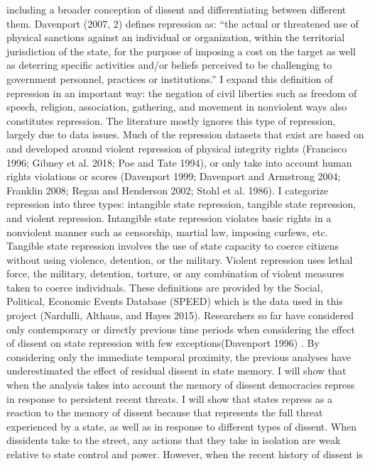 \documentclass[ignorenonframetext,]{beamer}
\begin{document}
\begin{frame}[fragile]
including a broader conception of dissent and differentiating between
different them. Davenport (2007, 2) defines repression as: ``the actual
or threatened use of physical sanctions against an individual or
organization, within the territorial jurisdiction of the state, for the
purpose of imposing a cost on the target as well as deterring specific
activities and/or beliefs perceived to be challenging to government
personnel, practices or institutions.'' I expand this definition of
repression in an important way: the negation of civil liberties such as
freedom of speech, religion, association, gathering, and movement in
nonviolent ways also constitutes repression. The literature mostly
ignores this type of repression, largely due to data issues. Much of the
repression datasets that exist are based on and developed around violent
repression of physical integrity rights (Francisco 1996; Gibney et al.
2018; Poe and Tate 1994), or only take into account human rights
violations or scores (Davenport 1999; Davenport and Armstrong 2004;
Franklin 2008; Regan and Henderson 2002; Stohl et al. 1986). I
categorize repression into three types: intangible state repression,
tangible state repression, and violent repression. Intangible state
repression violates basic rights in a nonviolent manner such as
censorship, martial law, imposing curfews, etc. Tangible state
repression involves the use of state capacity to coerce citizens without
using violence, detention, or the military. Violent repression uses
lethal force, the military, detention, torture, or any combination of
violent measures taken to coerce individuals. These definitions are
provided by the Social, Political, Economic Events Database (SPEED)
which is the data used in this project (Nardulli, Althaus, and Hayes
2015). Researchers so far have considered only contemporary or directly
previous time periods when considering the effect of dissent on state
repression with few exceptions(Davenport 1996) . By considering only the
immediate temporal proximity, the previous analyses have underestimated
the effect of residual dissent in state memory. I will show that when
the analysis takes into account the memory of dissent democracies
repress in response to persistent recent threats. I will show that
states repress as a reaction to the memory of dissent because that
represents the full threat experienced by a state, as well as in
response to different types of dissent. When dissidents take to the
street, any actions that they take in isolation are weak relative to
state control and power. However, when the recent history of dissent is

\end{frame}
\end{document}
